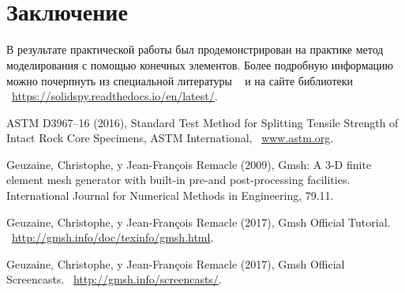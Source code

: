\documentclass[11pt]{article}
\makeatletter
\newcommand{\boxspacing}{\kern\kvtcb@left@rule\kern\kvtcb@boxsep}
\newcommand{\prompt}[4]{
        {\ttfamily\llap{{\color{#2}[#3]:\hspace{3pt}#4}}\vspace{-\baselineskip}}
    }
\makeatother
\begin{document}
    \begin{center}
    \end{center}
    { \hspace*{\fill} \\}
    
    \begin{center}
    \end{center}
    { \hspace*{\fill} \\}
    
    \begin{tcolorbox}[breakable, size=fbox, boxrule=1pt, pad at break*=1mm,colback=cellbackground, colframe=cellborder]
\prompt{In}{incolor}{ }{\boxspacing}
\begin{Verbatim}[commandchars=\\\{\}]

\end{Verbatim}
\end{tcolorbox}

\section{Заключение}
В результате практической работы был продемонстрирован на практике метод моделирования с помощью конечных элементов. Более подробную информацию можно почерпнуть из специальной литературы ~\cite{Gmsh2009,Gmsh_tut,Gmsh_scr} и на сайте библиотеки ~\url{https://solidspy.readthedocs.io/en/latest/}.

\begin{thebibliography}{3}
 ASTM D3967–16 (2016), Standard Test Method for Splitting Tensile Strength of Intact Rock Core Specimens, ASTM International, ~\url{www.astm.org}.

	Geuzaine, Christophe, y Jean-François Remacle (2009), Gmsh: A 3-D finite element mesh generator with built-in pre-and post-processing facilities. International Journal for Numerical Methods in Engineering, 79.11.

	Geuzaine, Christophe, y Jean-François Remacle (2017), Gmsh Official Tutorial. ~\url{http://gmsh.info/doc/texinfo/gmsh.html}.

	Geuzaine, Christophe, y Jean-François Remacle (2017), Gmsh Official Screencasts.  ~\url{http://gmsh.info/screencasts/}.
    
\end{thebibliography}
    
\end{document}
